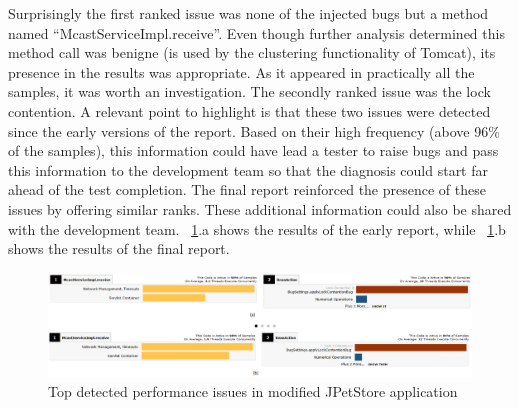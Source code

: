\documentclass[runningheads,a4paper]{llncs}
\begin{document}
Surprisingly the first ranked issue was none of the injected bugs but a method
named ``McastServiceImpl.receive''. Even though further analysis determined
this method call was benigne (is used by the clustering functionality of
Tomcat), its presence in the results was appropriate. As it appeared in
practically all the samples, it was worth an investigation. The secondly ranked
issue was the lock contention. A relevant point to highlight is that these two
issues were detected since the early versions of the report. Based on their high
frequency (above 96\% of the samples), this information could have lead a 
tester to raise bugs and pass this information to the development team so that
the diagnosis could start far ahead of the test completion. The final report
reinforced the presence of these issues by offering similar ranks. These
additional information could also be shared with the development team.
\figurename ~\ref{fig_run1_bugs12}.a shows the results of the early report,
while ~\ref{fig_run1_bugs12}.b shows the results of the final report.
\vspace{-5pt}
\begin{figure}[!h]
\includegraphics[totalheight=.23\textheight,width=1\textwidth]{run1_issues12_short_long_run}
\caption{Top detected performance issues in modified JPetStore application}
\label{fig_run1_bugs12}
\end{figure}
\vspace{-5pt}
\end{document}
